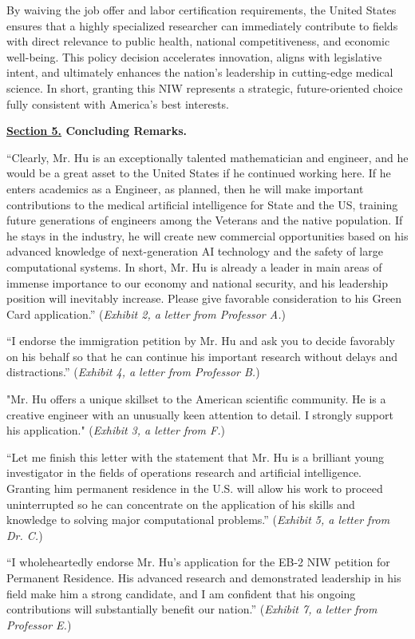 \documentclass{article}
\begin{document}
By waiving the job offer and labor certification requirements, the United States ensures that a highly specialized researcher can immediately contribute to fields with direct relevance to public health, national competitiveness, and economic well-being. This policy decision accelerates innovation, aligns with legislative intent, and ultimately enhances the nation’s leadership in cutting-edge medical science. In short, granting this NIW represents a strategic, future-oriented choice fully consistent with America’s best interests.

\clearpage

{\bf \underline{Section 5.} Concluding Remarks. }

“Clearly, Mr. Hu is an exceptionally talented mathematician and engineer, and he would be a great asset to the United States if he continued working here. If he enters academics as a Engineer, as planned, then he will make important contributions to the medical artificial intelligence for State and the US, training future generations of engineers among the Veterans and the native population. If he stays in the industry, he will create new commercial opportunities based on his advanced knowledge of next-generation AI technology and the safety of large computational systems. In short, Mr. Hu is already a leader in main areas of immense importance to our economy and national security, and his leadership position will inevitably increase. Please give favorable consideration to his Green Card application.” ({\it Exhibit 2, a letter from Professor A.}) 

“I endorse the immigration petition by Mr. Hu and ask you to decide favorably on his behalf so that he can continue his important research without delays and distractions.” ({\it Exhibit 4, a letter from Professor B.}) 

"Mr. Hu offers a unique skillset to the American scientific community. He is a creative engineer with an unusually keen attention to detail. I strongly support his application." ({\it Exhibit 3, a letter from F.}) 

“Let me finish this letter with the statement that Mr. Hu is a brilliant young investigator in the fields of operations research and artificial intelligence. Granting him permanent residence in the U.S. will allow his work to proceed uninterrupted so he can concentrate on the application of his skills and knowledge to solving major computational problems.” ({\it Exhibit 5, a letter from Dr. C.}) 

“I wholeheartedly endorse Mr. Hu's application for the EB-2 NIW petition for Permanent Residence. His advanced research and demonstrated leadership in his field make him a strong candidate, and I am confident that his ongoing contributions will substantially benefit our nation.” ({\it Exhibit 7, a letter from Professor E.}) 
\end{document}
